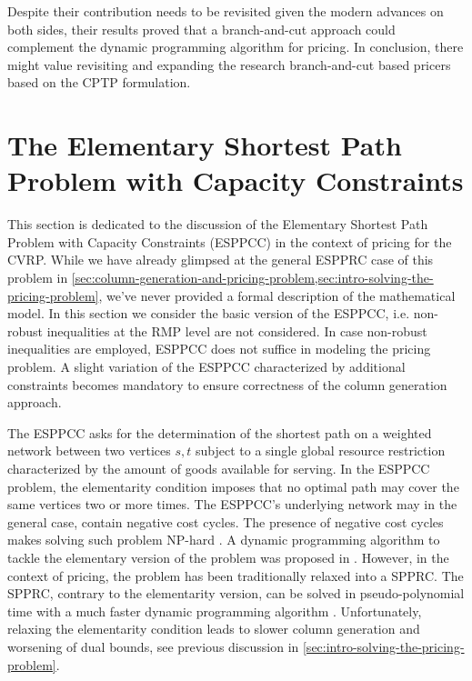 Despite their contribution needs to be revisited given the modern advances on both sides,
their results proved that a branch-and-cut approach could complement
the dynamic programming algorithm for pricing.
In conclusion, there might value revisiting and
expanding the research branch-and-cut based pricers based on the CPTP formulation.

\section{The Elementary Shortest Path Problem with Capacity Constraints}
\label{sec:the-elementary-shortest-path-problem-with-capacity-constraints}

This section is dedicated to the discussion of the
Elementary Shortest Path Problem with Capacity Constraints (ESPPCC)
in the context of pricing for the CVRP.
While we have already glimpsed at the general ESPPRC case of this problem in
\cref{sec:column-generation-and-pricing-problem,sec:intro-solving-the-pricing-problem},
we've never provided a formal description of the mathematical model.
In this section we consider the basic version of the ESPPCC,
i.e. non-robust inequalities at the RMP level are not considered.
In case non-robust inequalities are employed,
ESPPCC does not suffice in modeling the pricing problem.
A slight variation of the ESPPCC characterized by additional constraints
becomes mandatory to ensure correctness of the column generation approach.

The ESPPCC asks for the determination of the shortest path on a weighted network
between two vertices $s, t$
subject to a single global resource restriction characterized
by the amount of goods available for serving.
In the ESPPCC problem,
the elementarity condition imposes that no optimal path may
cover the same vertices two or more times.
The ESPPCC's underlying network may in the general case,
contain negative cost cycles.
The presence of negative cost cycles makes solving such problem NP-hard \parencite{dror1994}.
A dynamic programming algorithm
to tackle the elementary version of the problem
was proposed in \textcite{feillet2004}.
However, in the context of pricing, the problem has been traditionally relaxed into a SPPRC.
The SPPRC,
contrary to the elementarity version,
can be solved in pseudo-polynomial time with a much faster dynamic programming algorithm \parencite{desrochers1992}.
Unfortunately,
relaxing the elementarity condition leads to slower column generation and worsening of dual bounds,
see previous discussion in \cref{sec:intro-solving-the-pricing-problem}.

